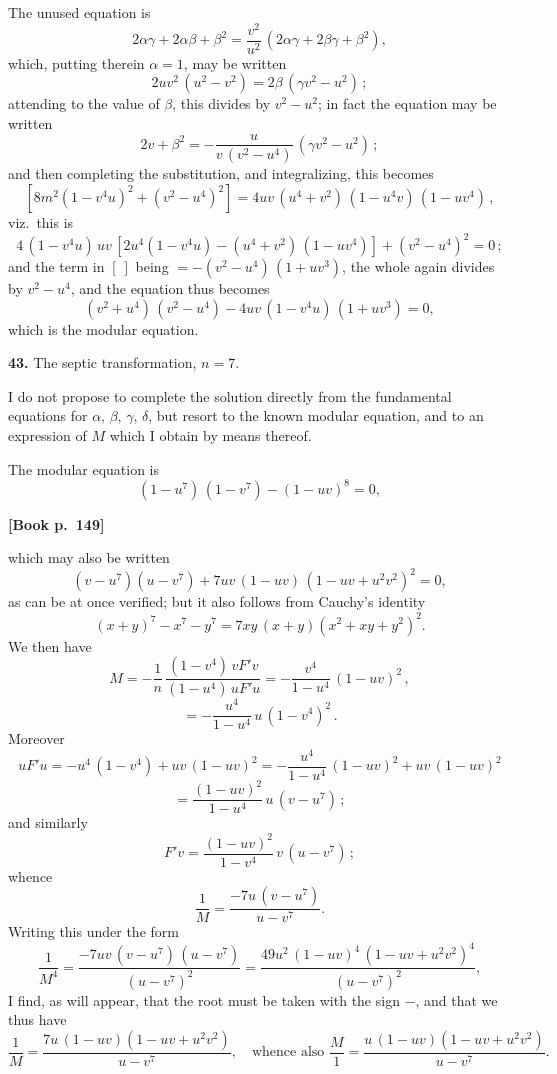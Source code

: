 \documentclass[11pt]{article}
\begin{document}
The unused equation is
\[
2\alpha\gamma + 2\alpha\beta + \beta^2 = \frac{v^2}{u^2}\,(2\alpha\gamma + 2\beta\gamma + \beta^2),
\]
which, putting therein $\alpha = 1$, may be written
\[
2u v^2\,(u^2 - v^2) = 2\beta\,(\gamma v^2 - u^2)\,;
\]
attending to the value of $\beta$, this divides by $v^2 - u^2$; in fact the equation
may be written
\[
2v + \beta^2 = -\frac{u}{v\,(v^2 - u^4)}\,(\gamma v^2 - u^2)\,;
\]
and then completing the substitution, and integralizing, this becomes
\[
[8m^2(1-v^4 u)^2 + (v^2 - u^4)^2] = 4uv\,(u^4 + v^2)\,(1 - u^4 v)\,(1-uv^4)\,,
\]
viz.\ this is
\[
4\,(1 - v^4 u)\,uv\,[2u^4 (1 - v^4 u) - (u^4 + v^2)\,(1 - uv^4)] + (v^2 - u^4)^2 = 0\,;
\]
and the term in $[\ ]$ being $=-(v^2 - u^4)\,(1 + uv^3)$, the whole again divides by
$v^2 - u^4$, and the equation thus becomes
\[
(v^2 + u^4)\,(v^2 - u^4) - 4uv\,(1 - v^4 u)\,(1 + uv^3) = 0,
\]
which is the modular equation.

\medskip

\textbf{43.} The septic transformation, $n=7$.

I do not propose to complete the solution directly from the fundamental equations
for $\alpha,\,\beta,\,\gamma,\,\delta$, but resort to the known modular equation, and to an
expression of $M$ which I obtain by means thereof.

The modular equation is
\[
(1 - u^7)\,(1 - v^7) - (1 - uv)^8 = 0,
\]

\bigskip

\noindent\textbf{[Book p.~149]}

\medskip

\noindent
which may also be written
\[
(v - u^7)(u - v^7) + 7uv\,(1 - uv)\,(1 - uv + u^2 v^2)^2 = 0,
\]
as can be at once verified; but it also follows from Cauchy's identity
\[
(x + y)^7 - x^7 - y^7 = 7xy\,(x+y)(x^2 + xy + y^2)^2.
\]
We then have
\[
M = -\frac{1}{n}\,\frac{(1 - v^4)\,vF'v}{(1 - u^4)\,uF'u}
= -\frac{v^4}{1 - u^4}\,(1 - uv)^2\,,
\]
\[
= -\frac{u^4}{1 - u^4}\,u\,(1 - v^4)^2\,.
\]
Moreover
\[
uF'u = -u^4\,(1 - v^4) + uv\,(1 - uv)^2
= -\frac{u^4}{1 - u^4}\,(1 - uv)^2 + uv\,(1 - uv)^2
\]
\[
= \frac{(1 - uv)^2}{1 - u^4}\,u\,(v - u^7)\,;
\]
and similarly
\[
F'v = \frac{(1 - uv)^2}{1 - v^4}\,v\,(u - v^7)\,;
\]
whence
\[
\frac{1}{M} = \frac{-7u\,(v - u^7)}{u - v^7}.
\]
Writing this under the form
\[
\frac{1}{M^4} = \frac{-7uv\,(v - u^7)\,(u - v^7)}{(u - v^7)^2}
= \frac{49u^2\,(1 - uv)^4\,(1 - uv + u^2 v^2)^4}{(u - v^7)^2},
\]
I find, as will appear, that the root must be taken with the sign $-$, and that we
thus have
\[
\frac{1}{M} = \frac{7u\,(1 - uv)(1 - uv + u^2 v^2)}{u - v^7},\quad\text{whence also } \frac{M}{1} = \frac{u\,(1 - uv)(1 - uv + u^2 v^2)}{u - v^7}.
\]
\end{document}
